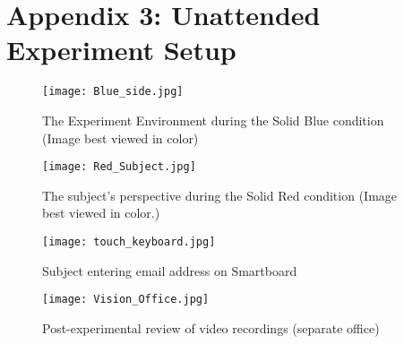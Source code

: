 \documentclass{llncs}
\begin{document}
\section*{Appendix 3: Unattended Experiment Setup} \label{app:pics}

\begin{figure}
    \centering
    \begin{minipage}{0.45\textwidth}
        \centering
\texttt{[image: Blue\_side.jpg]}
\caption{{\small The Experiment Environment during the Solid Blue condition (Image best viewed in color)} }
\label{fig:proxy}
    \end{minipage}\hfill
    \begin{minipage}{0.45\textwidth}
        \centering
\texttt{[image: Red\_Subject.jpg]}
\caption{{\small The subject's perspective during the Solid Red condition (Image best viewed in color.)}}
    \end{minipage}
\end{figure}

\begin{figure}
    \centering
    \begin{minipage}{0.45\textwidth}
        \centering
\texttt{[image: touch\_keyboard.jpg]}
\caption{{\small  Subject entering email address on Smartboard} }
\label{fig:proxy}
    \end{minipage}\hfill
    \begin{minipage}{0.45\textwidth}
        \centering
\texttt{[image: Vision\_Office.jpg]}
\caption{{\small Post-experimental review of video recordings (separate office)}}
    \end{minipage}
\end{figure}


\end{document}

